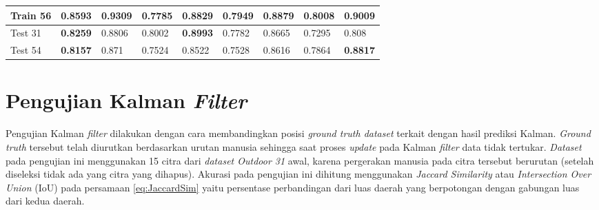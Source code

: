\begin{table}[H]
\begin{small}
\begin{tabular}{|l|l|l|l|l|l|l|l|l|}
Train 56                                                                                         & \textbf{0.8593}                                  & \textbf{0.9309}                              & 0.7785                                        & 0.8829                                    & 0.7949                                         & 0.8879                                    & 0.8008                                        & 0.9009                                    \\ \hline
Test 31                                                                                          & \textbf{0.8259}                                  & 0.8806                                       & 0.8002                                          & \textbf{0.8993}                             & 0.7782                                          & 0.8665                                      & 0.7295                                          & 0.808                                      \\ \hline
Test 54                                                                                          & \textbf{0.8157}                                  & 0.871                                       & 0.7524                                          & 0.8522                                      & 0.7528                                          & 0.8616                                      & 0.7864                                          & \textbf{0.8817}                             \\ \hline
\end{tabular}
\end{small}
\end{table}

\section{Pengujian Kalman \textit{Filter}}
\noindent Pengujian Kalman \textit{filter} dilakukan dengan cara membandingkan posisi \textit{ground truth dataset} terkait dengan hasil prediksi Kalman. \textit{Ground truth} tersebut telah diurutkan berdasarkan urutan manusia sehingga saat proses \textit{update} pada Kalman \textit{filter} data tidak tertukar. \textit{Dataset} pada pengujian ini menggunakan 15 citra dari \textit{dataset Outdoor 31} awal, karena pergerakan manusia pada citra tersebut berurutan (setelah diseleksi tidak ada yang citra yang dihapus). Akurasi pada pengujian ini dihitung menggunakan \textit{Jaccard Similarity} atau \textit{Intersection Over Union} (IoU) pada persamaan \ref{eq:JaccardSim} yaitu persentase perbandingan dari luas daerah yang berpotongan dengan gabungan luas dari kedua daerah.

